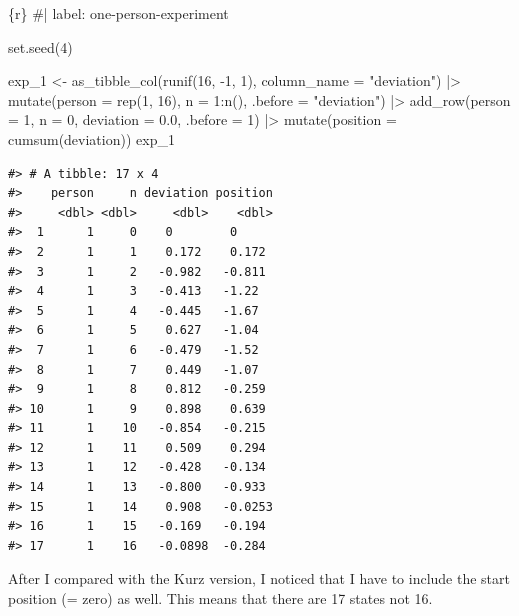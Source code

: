 \documentclass[
  letterpaper,
  DIV=11,
  numbers=noendperiod]{scrreprt}
\newenvironment{Shaded}{\begin{snugshade}}{\end{snugshade}}
\newcommand{\AttributeTok}[1]{\textcolor[rgb]{0.40,0.45,0.13}{#1}}
\newcommand{\CommentTok}[1]{\textcolor[rgb]{0.37,0.37,0.37}{#1}}
\newcommand{\DecValTok}[1]{\textcolor[rgb]{0.68,0.00,0.00}{#1}}
\newcommand{\FloatTok}[1]{\textcolor[rgb]{0.68,0.00,0.00}{#1}}
\newcommand{\FunctionTok}[1]{\textcolor[rgb]{0.28,0.35,0.67}{#1}}
\newcommand{\InformationTok}[1]{\textcolor[rgb]{0.37,0.37,0.37}{#1}}
\newcommand{\NormalTok}[1]{\textcolor[rgb]{0.00,0.23,0.31}{#1}}
\newcommand{\OtherTok}[1]{\textcolor[rgb]{0.00,0.23,0.31}{#1}}
\newcommand{\SpecialCharTok}[1]{\textcolor[rgb]{0.37,0.37,0.37}{#1}}
\newcommand{\StringTok}[1]{\textcolor[rgb]{0.13,0.47,0.30}{#1}}
\begin{document}
\begin{Shaded}
\begin{Highlighting}[]
\InformationTok{\textasciigrave{}\textasciigrave{}\textasciigrave{}\{r\}}
\CommentTok{\#| label: one{-}person{-}experiment}

\FunctionTok{set.seed}\NormalTok{(}\DecValTok{4}\NormalTok{)}


\NormalTok{exp\_1 }\OtherTok{\textless{}{-}} \FunctionTok{as\_tibble\_col}\NormalTok{(}\FunctionTok{runif}\NormalTok{(}\DecValTok{16}\NormalTok{, }\SpecialCharTok{{-}}\DecValTok{1}\NormalTok{, }\DecValTok{1}\NormalTok{), }\AttributeTok{column\_name =} \StringTok{"deviation"}\NormalTok{) }\SpecialCharTok{|\textgreater{}} 
    \FunctionTok{mutate}\NormalTok{(}\AttributeTok{person =} \FunctionTok{rep}\NormalTok{(}\DecValTok{1}\NormalTok{, }\DecValTok{16}\NormalTok{),}
           \AttributeTok{n =} \DecValTok{1}\SpecialCharTok{:}\FunctionTok{n}\NormalTok{(), }
           \AttributeTok{.before =} \StringTok{"deviation"}\NormalTok{) }\SpecialCharTok{|\textgreater{}} 
    \FunctionTok{add\_row}\NormalTok{(}\AttributeTok{person =} \DecValTok{1}\NormalTok{, }\AttributeTok{n =} \DecValTok{0}\NormalTok{, }\AttributeTok{deviation =} \FloatTok{0.0}\NormalTok{, }\AttributeTok{.before =} \DecValTok{1}\NormalTok{) }\SpecialCharTok{|\textgreater{}} 
    \FunctionTok{mutate}\NormalTok{(}\AttributeTok{position =} \FunctionTok{cumsum}\NormalTok{(deviation))}
\NormalTok{exp\_1}
\InformationTok{\textasciigrave{}\textasciigrave{}\textasciigrave{}}
\end{Highlighting}
\end{Shaded}

\begin{verbatim}
#> # A tibble: 17 x 4
#>    person     n deviation position
#>     <dbl> <dbl>     <dbl>    <dbl>
#>  1      1     0    0        0     
#>  2      1     1    0.172    0.172 
#>  3      1     2   -0.982   -0.811 
#>  4      1     3   -0.413   -1.22  
#>  5      1     4   -0.445   -1.67  
#>  6      1     5    0.627   -1.04  
#>  7      1     6   -0.479   -1.52  
#>  8      1     7    0.449   -1.07  
#>  9      1     8    0.812   -0.259 
#> 10      1     9    0.898    0.639 
#> 11      1    10   -0.854   -0.215 
#> 12      1    11    0.509    0.294 
#> 13      1    12   -0.428   -0.134 
#> 14      1    13   -0.800   -0.933 
#> 15      1    14    0.908   -0.0253
#> 16      1    15   -0.169   -0.194 
#> 17      1    16   -0.0898  -0.284
\end{verbatim}

After I compared with the Kurz version, I noticed that I have to include
the start position (= zero) as well. This means that there are 17 states
not 16.
\end{document}
